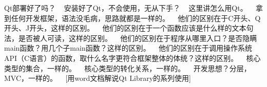 Qt部署好了吗？ ~\newline
安装好了\+Qt，不会使用，无从下手？ ~\newline
这里讲怎么用\+Qt。 ~\newline
 拿到任何开发框架，语法没毛病，思路就都是一样的。 ~\newline
 他们的区别在于\+C开头、\+Q开头、\+J开头，这样的区别。 ~\newline
他们的区别在于一个函数应该是什么样的文本句法，是否被人可读，这样的区别。 ~\newline
他们的区别在于程序从哪里入口？是否隐瞒main函数？用几个子main函数？这样的区别。 ~\newline
他们的区别在于调用操作系统\+A\+P\+I（\+C语言）的函数，取什么名字更符合框架整体的体统？这样的区别。 ~\newline
 核心类型的集合，一样的。 ~\newline
核心类型的转化关系，一样的。 ~\newline
开发思想？分层，\+M\+V\+C，一样的。 ~\newline
 \mbox{[}用word文档解说\+Qt Library的系列使用\mbox{]} 